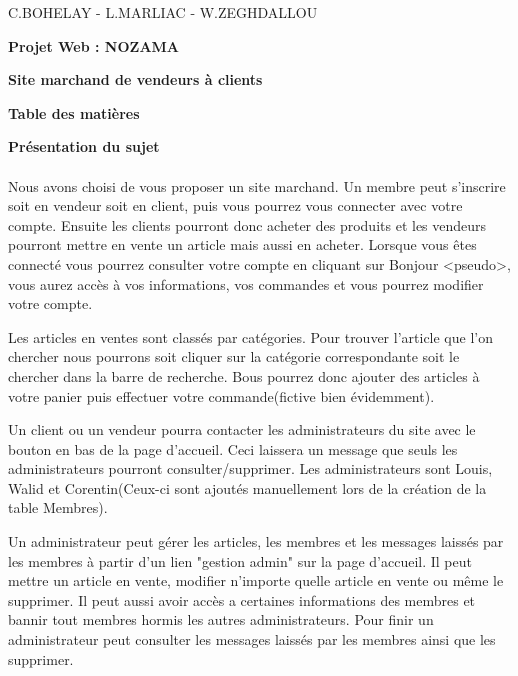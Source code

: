 \documentclass[11pt,a4paper]{article}
\begin{document}
	\begin{center}
		\centering C.BOHELAY - L.MARLIAC - W.ZEGHDALLOU	
	\end{center}
	\bigskip
	\bigskip
	\bigskip
	\bigskip
	\bigskip
	\begin{center}
		\textbf{\Large Projet Web : NOZAMA}
	\end{center}
	\bigskip
	\bigskip
	\bigskip
	\bigskip
	\bigskip
	\begin{center}
		\textbf{\Large Site marchand de vendeurs \`a clients}
		
	\end{center}
	\newpage
	\begin{center}
		\textbf{\Large Table des mati\`eres}
	\end{center}
	\newpage
	\begin{center}
		\textbf{\Large Pr\'esentation du sujet}
	\end{center}
	\bigskip
	\paragraph{}

	Nous avons choisi de vous proposer un site marchand. Un membre peut s'inscrire soit en vendeur soit en client, puis vous pourrez vous connecter avec votre compte. Ensuite les clients pourront donc acheter des produits et les vendeurs pourront mettre en vente un article mais aussi en acheter. Lorsque vous \^etes connect\'e vous pourrez consulter votre compte en cliquant sur Bonjour <pseudo>, vous aurez acc\`es \`a vos informations, vos commandes et vous pourrez modifier votre compte. 

	Les articles en ventes sont class\'es par cat\'egories. Pour trouver l'article que l'on chercher nous pourrons soit cliquer sur la cat\'egorie correspondante soit le chercher dans la barre de recherche. Bous pourrez donc ajouter des articles \`a votre panier puis effectuer votre commande(fictive bien \'evidemment). 
	
	Un client ou un vendeur pourra contacter les administrateurs du site avec le bouton en bas de la page d'accueil. Ceci laissera un message que seuls les administrateurs pourront consulter/supprimer. Les administrateurs sont Louis, Walid et Corentin(Ceux-ci sont ajout\'es manuellement lors de la cr\'eation de la table Membres).
	
	Un administrateur peut g\'erer les articles, les membres et les messages laiss\'es par les membres \`a partir d'un lien "gestion admin" sur la page d'accueil. Il peut mettre un article en vente, modifier n'importe quelle article en vente ou m\^eme le supprimer. Il peut aussi avoir acc\`es a certaines informations des membres et bannir tout membres hormis les autres administrateurs. Pour finir un administrateur peut consulter les messages laiss\'es par les membres ainsi que les supprimer.
	
\end{document}
